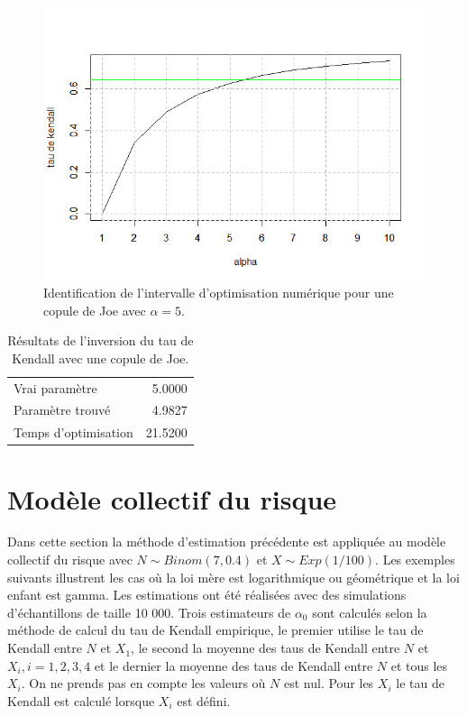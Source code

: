 \documentclass{article}
\begin{document}
	\begin{figure}[H]
		\centering
		\includegraphics[height=8cm]{Graph/intevalle_Joe.png}
		\caption[Identification de l'intervalle d'optimisation numérique pour le scénario \ref{scenario_Joe}]
		{Identification de l'intervalle d'optimisation numérique pour une copule de Joe avec $\alpha = 5$.} 
		\label{graph_intervalle_Joe}
	\end{figure}
	
	\begin{table}[H]
		\centering
		\begin{tabular}{lr}
			\hline
			Vrai paramètre & 5.0000 \\ 
			Paramètre trouvé & 4.9827 \\ 
			Temps d'optimisation & 21.5200 \\ 
			\hline 
		\end{tabular}
		\caption{Résultats de l'inversion du tau de Kendall avec une copule de Joe.}
		\label{tbl_Resultats_Joe}
	\end{table}

	
	\section{Modèle collectif du risque}
	
	Dans cette section la méthode d'estimation précédente est appliquée au modèle collectif du risque avec $N \sim Binom(7,0.4) $ et $X \sim Exp(1/100)$. Les exemples suivants illustrent les cas où la loi mère est logarithmique ou géométrique et la loi enfant est gamma. Les estimations ont été réalisées avec des simulations d'échantillons de taille 10 000. Trois estimateurs de $\alpha_{0}$ sont calculés selon la méthode de calcul du tau de Kendall empirique, le premier utilise le tau de Kendall entre $N$ et $X_{1}$, le second la moyenne des taus de Kendall entre $N$ et $X_{i},i=1,2,3,4$ et le dernier la moyenne des taus de Kendall entre $N$ et tous les $X_{i}$. On ne prends pas en compte les valeurs où $N$ est nul. Pour les $X_{i}$ le tau de Kendall est calculé lorsque $X_{i}$ est défini.
	
\end{document}

